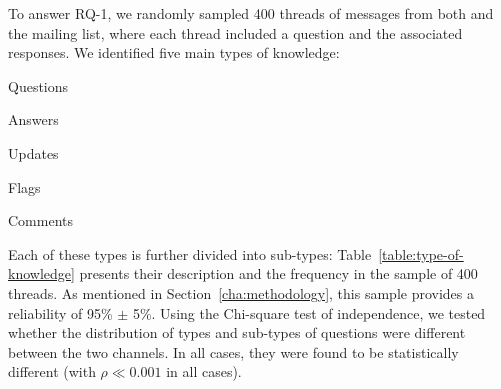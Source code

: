To answer RQ-1, we randomly sampled 400 threads of messages from both \SO and the \RH mailing list, where each thread included a question and the associated responses. We identified five main types of knowledge:
\begin{enumerate*}[label=(\arabic*)]
\item Questions
\item Answers
\item Updates
\item Flags
\item Comments
\end{enumerate*}
Each of these types is further divided into sub-types: Table~\ref{table:type-of-knowledge} presents their description and the frequency in the sample of 400 threads. As mentioned in Section~\ref{cha:methodology}, this sample provides a reliability of 95\% $\pm$ 5\%. Using the Chi-square test of independence, we tested whether the distribution of types and sub-types of questions were different between the two channels.  In
all cases, they were found to be statistically different (with $\rho \ll 0.001$ in all cases).
